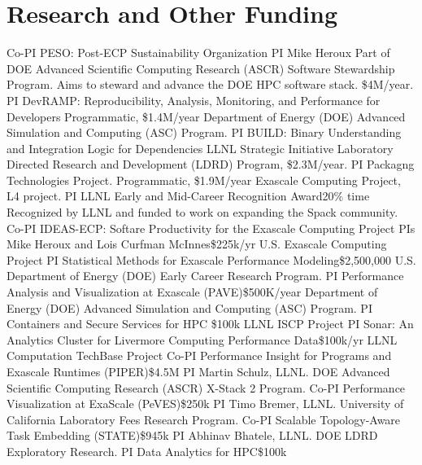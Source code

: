 \section{Research and Other Funding}
		{Co-PI}
		{PESO: Post-ECP Sustainability Organization}
        {PI Mike Heroux}{}
	{Part of DOE Advanced Scientific Computing Research (ASCR) Software Stewardship Program.
          Aims to steward and advance the DOE HPC software stack.
          \$4M/year.}
		{PI}
		{DevRAMP: Reproducibility, Analysis, Monitoring, and Performance for Developers}
        {}{Programmatic, \$1.4M/year}
		{Department of Energy (DOE) Advanced Simulation and Computing (ASC) Program.}
		{PI}
		{BUILD: Binary Understanding and Integration Logic for Dependencies}
        {}{LLNL Strategic Initiative}
		{Laboratory Directed Research and Development (LDRD) Program, \$2.3M/year.}
		{PI}
		{Packagng Technologies Project.}
        {}{Programmatic, \$1.9M/year}
		{Exascale Computing Project, L4 project.}
		{PI}
		{LLNL Early and Mid-Career Recognition Award}{}{20\% time}
		{Recognized by LLNL and funded to work on expanding the Spack community.}
		{Co-PI}
		{IDEAS-ECP: Softare Productivity for the Exascale Computing Project}
        {PIs Mike Heroux and Lois Curfman McInnes}{\$225k/yr}
		{U.S. Exascale Computing Project}
		{PI}
		{Statistical Methods for Exascale Performance Modeling}{}{\$2,500,000}
		{U.S. Department of Energy (DOE) Early Career Research Program.}
		{PI}
		{Performance Analysis and Visualization at Exascale (PAVE)}{}{\$500K/year}
		{%
		 Department of Energy (DOE) Advanced Simulation and Computing (ASC) Program.}
		{PI}
		{Containers and Secure Services for HPC}
        {}{\$100k}
		{LLNL ISCP Project}
		{PI}
		{Sonar: An Analytics Cluster for Livermore Computing Performance Data}{}{\$100k/yr}
		{LLNL Computation TechBase Project}
		{Co-PI}
		{Performance Insight for Programs and Exascale Runtimes (PIPER)}{}{\$4.5M}
		{PI Martin Schulz, LLNL. DOE Advanced Scientific Computing Research (ASCR)
		 X-Stack 2 Program.}
		{Co-PI}
		{Performance Visualization at ExaScale (PeVES)}{}{\$250k}
		{PI Timo Bremer, LLNL. University of California Laboratory Fees Research Program.}
		{Co-PI}
		{Scalable Topology-Aware Task Embedding (STATE)}{}{\$945k}
		{PI Abhinav Bhatele, LLNL. DOE LDRD Exploratory Research.}
		{PI}
		{Data Analytics for HPC}{}{\$100k}
		{}
